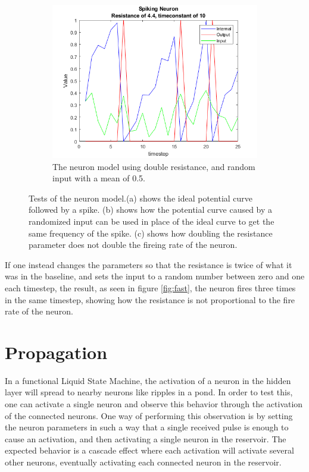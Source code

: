 \begin{figure}
    \begin{subfigure}[b]{0.3\textwidth}
        \includegraphics[width=\textwidth]{Images/fast.png}
        \caption{The neuron model using double resistance, and random input with a mean of 0.5.}
        \label{fig:implementation_test}
    \end{subfigure}
    \caption{Tests of the neuron model.(a) shows the ideal potential curve followed by a spike. (b) shows how the potential curve caused by a randomized input can be used in place of the ideal curve to get the same frequency of the spike. (c) shows how doubling the resistance parameter does not double the fireing rate of the neuron.}
    \label{fig:implementation_test}
\end{figure}

If one instead changes the parameters so that the resistance is twice of what it was in the baseline, and sets the input to a random number between zero and one each timestep, the result, as seen in figure \ref{fig:fast}, the neuron fires three times in the same timestep, showing how the resistance is not proportional to the fire rate of the neuron.

\section{Propagation}

In a functional Liquid State Machine, the activation of a neuron in the hidden layer will spread to nearby neurons like ripples in a pond. In order to test this, one can activate a single neuron and observe this behavior through the activation of the connected neurons. One way of performing this observation is by setting the neuron parameters in such a way that a single received pulse is enough to cause an activation, and then activating a single neuron in the reservoir. The expected behavior is a cascade effect where each activation will activate several other neurons, eventually activating each connected neuron in the reservoir.

